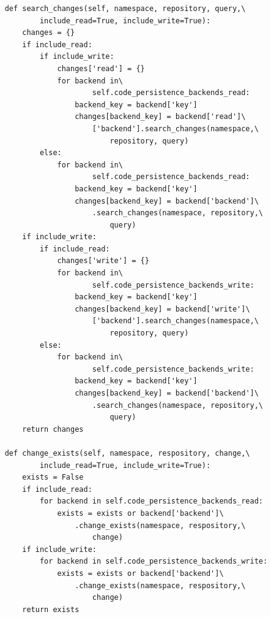 \begin{lstlisting}
    def search_changes(self, namespace, repository, query,\
            include_read=True, include_write=True):
        changes = {}
        if include_read:
            if include_write:
                changes['read'] = {}
                for backend in\
                        self.code_persistence_backends_read:
                    backend_key = backend['key']
                    changes[backend_key] = backend['read']\
                        ['backend'].search_changes(namespace,\
                            repository, query)
            else:
                for backend in\
                        self.code_persistence_backends_read:
                    backend_key = backend['key']
                    changes[backend_key] = backend['backend']\
                        .search_changes(namespace, repository,\
                            query)
        if include_write:
            if include_read:
                changes['write'] = {}
                for backend in\
                        self.code_persistence_backends_write:
                    backend_key = backend['key']
                    changes[backend_key] = backend['write']\
                        ['backend'].search_changes(namespace,\
                            repository, query)
            else:
                for backend in\
                        self.code_persistence_backends_write:
                    backend_key = backend['key']
                    changes[backend_key] = backend['backend']\
                        .search_changes(namespace, repository,\
                            query)
        return changes

    def change_exists(self, namespace, respository, change,\
            include_read=True, include_write=True):
        exists = False
        if include_read:
            for backend in self.code_persistence_backends_read:
                exists = exists or backend['backend']\
                    .change_exists(namespace, respository,\
                        change)
        if include_write:
            for backend in self.code_persistence_backends_write:
                exists = exists or backend['backend']\
                    .change_exists(namespace, respository,\
                        change)
        return exists


\end{lstlisting}
